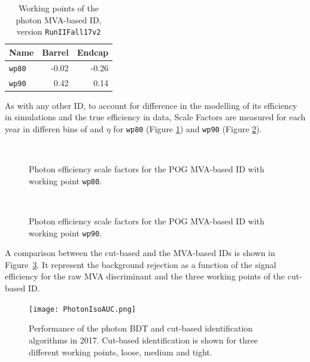 \begin{table}[ht]
\caption[.]{Working points of the photon MVA-based ID, version \texttt{RunIIFall17v2}}
\label{tab:MVAwpCuts}
\centering
\begin{tabular}{lrr}
\toprule
Name & Barrel & Endcap \\
\midrule
\texttt{wp80} & -0.02 & -0.26 \\
\texttt{wp90} &  0.42 &  0.14 \\
\bottomrule
\end{tabular}
\end{table}

As with any other ID, to account for difference in the modelling of its efficiency in simulations and the true efficiency in data,
Scale Factors are measured for each year in differen bins of \pt and $\eta$ for \texttt{wp80} (Figure \ref{fig:phEffMVASF_wp80}) and \texttt{wp90} (Figure \ref{fig:phEffMVASF_wp90}).

\begin{figure}
\centering
{}%
\\
\caption{Photon efficiency scale factors for the POG MVA-based ID with working point \texttt{wp80}.}
\label{fig:phEffMVASF_wp80}
\end{figure}

\begin{figure}
\centering
{}%
\\
\caption{Photon efficiency scale factors for the POG MVA-based ID with working point \texttt{wp90}.}
\label{fig:phEffMVASF_wp90}
\end{figure}

A comparison between the cut-based and the MVA-based IDs is shown in Figure~\ref{fig:PhotonIsoAUC}.
It represent the background rejection as a function of the signal efficiency for the raw MVA discriminant
and the three working points of the cut-based ID.

\begin{figure}
\centering
\texttt{[image: PhotonIsoAUC.png]}
\caption{Performance of the photon BDT and cut-based identification algorithms in 2017.
Cut-based identification is shown for three different working points, loose, medium and tight.}
\label{fig:PhotonIsoAUC}
\end{figure}

